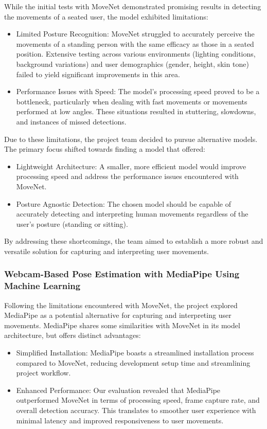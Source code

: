 \documentclass[]{article}
\begin{document}
While the initial tests with MoveNet demonstrated promising results in detecting the movements of a seated user, the model exhibited limitations:

\begin{itemize}
\item Limited Posture Recognition: MoveNet struggled to accurately perceive the movements of a standing person with the same efficacy as those in a seated position. Extensive testing across various environments (lighting conditions, background variations) and user demographics (gender, height, skin tone) failed to yield significant improvements in this area.
\item Performance Issues with Speed: The model's processing speed proved to be a bottleneck, particularly when dealing with fast movements or movements performed at low angles. These situations resulted in stuttering, slowdowns, and instances of missed detections.
\end{itemize}

\noindent Due to these limitations, the project team decided to pursue alternative models. The primary focus shifted towards finding a model that offered:

\begin{itemize}
\item Lightweight Architecture: A smaller, more efficient model would improve processing speed and address the performance issues encountered with MoveNet.
\item Posture Agnostic Detection: The chosen model should be capable of accurately detecting and interpreting human movements regardless of the user's posture (standing or sitting).
\end{itemize}
By addressing these shortcomings, the team aimed to establish a more robust and versatile solution for capturing and interpreting user movements.

\subsubsection{Webcam-Based Pose Estimation with MediaPipe Using Machine Learning}

Following the limitations encountered with MoveNet, the project explored MediaPipe as a potential alternative for capturing and interpreting user movements. MediaPipe shares some similarities with MoveNet in its model architecture, but offers distinct advantages:

\begin{itemize}
\item Simplified Installation: MediaPipe boasts a streamlined installation process compared to MoveNet, reducing development setup time and streamlining project workflow.
\item Enhanced Performance: Our evaluation revealed that MediaPipe outperformed MoveNet in terms of processing speed, frame capture rate, and overall detection accuracy. This translates to smoother user experience with minimal latency and improved responsiveness to user movements.
\end{itemize}
\end{document}
